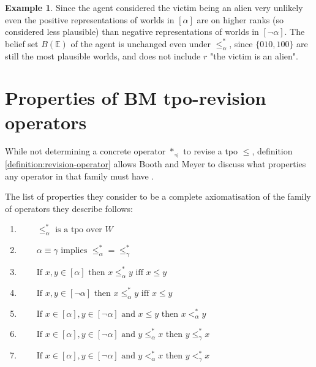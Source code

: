 \documentclass[english, 12pt]{scrartcl}
\theoremstyle{definition}
\newtheorem{example}{Example}[section]
\theoremstyle{definition}
\theoremstyle{definition}
\begin{document}
\begin{example}
    Since the agent considered the victim being an alien very unlikely even the positive representations of worlds in $[\alpha]$ are on higher ranks (so considered less plausible) than negative representations of worlds in $[\neg\alpha]$.
    The belief set $B(\mathbb{E})$ of the agent is unchanged even under $\leq_{\alpha}^{\ast}$, since $\{010, 100\}$ are still the most plausible worlds, and does not include $r$ "the victim is an alien".
\end{example}



\section{Properties of BM tpo-revision operators}
While not determining a concrete operator $\ast_{\preceq}$ to revise a tpo $\leq$, definition \ref{definition:revision-operator} allows Booth and Meyer to discuss what properties any operator in that family must have \cite{Booth2011}.

The list of properties they consider to be a complete axiomatisation of the family of operators they describe follows:

\begin{enumerate}[wide=0pt, widest=99,leftmargin=\parindent,label = ($\ast\arabic*$)]
    \item\label{AST1} $\qquad \leq_{\alpha}^{\ast} \textrm{ is a tpo over } W$
    \item\label{AST2} $\qquad\alpha \equiv \gamma \textrm{ implies } \leq_{\alpha}^{\ast}=\leq_{\gamma}^{\ast}$
    \item\label{AST3} $\qquad \textrm{If } x, y \in [\alpha] \textrm{ then } x \leq_{\alpha}^{\ast} y \textrm{ iff } x \leq y$
    \item\label{AST4} $\qquad \textrm{If } x, y \in [\neg\alpha] \textrm{ then } x \leq_{\alpha}^{\ast} y \textrm{ iff } x \leq y$
    \item\label{AST5} $\qquad \textrm{If } x \in [\alpha], y \in [\neg\alpha] \textrm{ and } x \leq y \textrm{ then } x <_{\alpha}^{\ast} y$
    \item\label{AST6} $\qquad \textrm{If } x \in [\alpha], y \in [\neg\alpha] \textrm{ and } y \leq_{\alpha}^{\ast} x \textrm{ then } y \leq_{\gamma}^{\ast} x$
    \item\label{AST7} $\qquad \textrm{If } x \in [\alpha], y \in [\neg\alpha] \textrm{ and } y <_{\alpha}^{\ast} x \textrm{ then } y <_{\gamma}^{\ast} x$
\end{enumerate}
\end{document}
